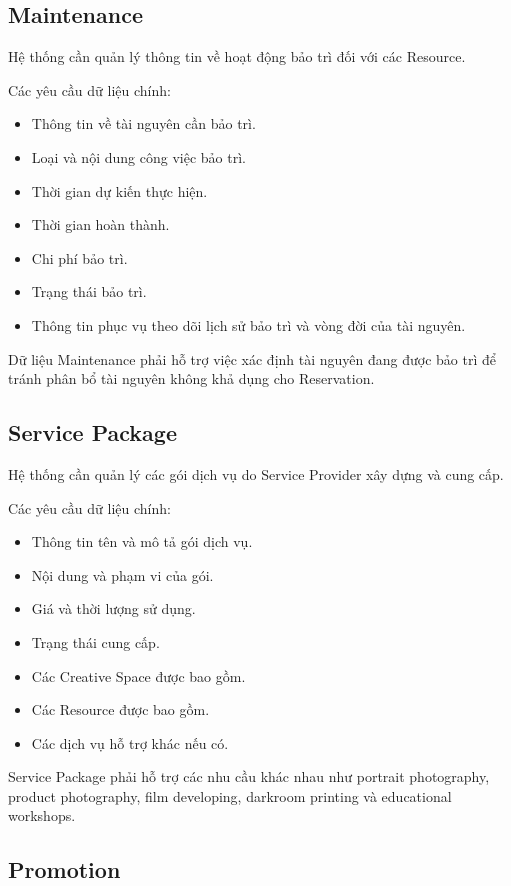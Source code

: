 \subsection{Maintenance}

Hệ thống cần quản lý thông tin về hoạt động bảo trì đối với các Resource.

Các yêu cầu dữ liệu chính:

\begin{itemize}
\item Thông tin về tài nguyên cần bảo trì.
\item Loại và nội dung công việc bảo trì.
\item Thời gian dự kiến thực hiện.
\item Thời gian hoàn thành.
\item Chi phí bảo trì.
\item Trạng thái bảo trì.
\item Thông tin phục vụ theo dõi lịch sử bảo trì và vòng đời của tài nguyên.
\end{itemize}

Dữ liệu Maintenance phải hỗ trợ việc xác định tài nguyên đang được bảo trì để tránh phân bổ tài nguyên không khả dụng cho Reservation.

\subsection{Service Package}

Hệ thống cần quản lý các gói dịch vụ do Service Provider xây dựng và cung cấp.

Các yêu cầu dữ liệu chính:

\begin{itemize}
\item Thông tin tên và mô tả gói dịch vụ.
\item Nội dung và phạm vi của gói.
\item Giá và thời lượng sử dụng.
\item Trạng thái cung cấp.
\item Các Creative Space được bao gồm.
\item Các Resource được bao gồm.
\item Các dịch vụ hỗ trợ khác nếu có.
\end{itemize}

Service Package phải hỗ trợ các nhu cầu khác nhau như portrait photography, product photography, film developing, darkroom printing và educational workshops.

\subsection{Promotion}

